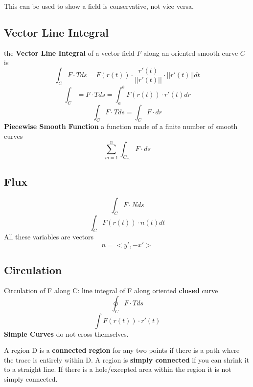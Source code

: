 \documentclass[a4paper, 12pt]{article}
\begin{document}
This can be used to show a field is conservative, not vice versa.
\subsection{Vector Line Integral}
the \textbf{Vector Line Integral} of a vector field $F$ along an oriented smooth curve $C$ is 
\begin{equation}
\int_{C}F \cdot T ds = F(r(t)) \cdot \frac{r'(t)}{||r'(t)||}\cdot ||r'(t)||dt
\end{equation}
\begin{equation}
	\int_{C}=F\cdot Tds = \int_{a}^{b}F(r(t))\cdot r'(t)dr
\end{equation}
\begin{equation}
\int_{C}F\cdot T ds = \int_{C}F\cdot dr	
\end{equation}
\textbf{Piecewise Smooth Function}
a function made of a finite number of smooth curves
\begin{equation}
\sum_{m=1}^{n}	\int_{C_{m}}F\cdot ds
\end{equation}
\subsection{Flux}
\begin{equation}
\int_{C}F\cdot N ds	
\end{equation}
\begin{equation}
\int_{C}F(r(t))\cdot n(t)dt	
\end{equation}
All these variables are vectors
\begin{equation}
n=<y',-x'>	
\end{equation}
\subsection{Circulation}
Circulation of F along C: line integral of F along oriented \textbf{closed} curve
\begin{equation}
\oint_{C}F\cdot T ds	
\end{equation}
\begin{equation}
\int F(r(t))\cdot r'(t)	
\end{equation}
\textbf{Simple Curves} do not cross themselves.

A region D is a \textbf{connected region} for any two points if there is a path where the trace is entirely within D. A region is \textbf{simply connected} if you can shrink it to a straight line. If there is a hole/excepted area within the region it is not simply connected.
\end{document}

